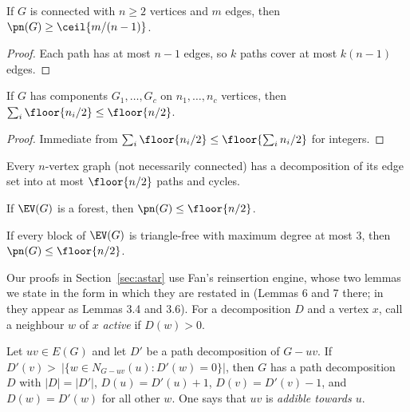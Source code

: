 \begin{lemma}\label{lem:LB2}
If $G$ is connected with $n\ge 2$ vertices and $m$ edges, then
$\pn(G)\ge \ceil{m/(n-1)}$.
\end{lemma}

\begin{proof}
Each path has at most $n-1$ edges, so $k$ paths cover at most $k(n-1)$ edges.
\end{proof}

\begin{lemma}\label{lem:sum}
If $G$ has components $G_1,\dots,G_c$ on $n_1,\dots,n_c$ vertices, then
$\sum_i \floor{n_i/2}\le \floor{n/2}$.
\end{lemma}

\begin{proof}
Immediate from $\sum_i \floor{n_i/2}\le \floor{\sum_i n_i /2}$ for integers.
\end{proof}

\begin{theorem}\label{thm:lovasz}
Every $n$-vertex graph (not necessarily connected) has a decomposition of its edge set into at
most $\floor{n/2}$ paths and cycles.
\end{theorem}

\begin{theorem}\label{thm:pyber}
If $\EV(G)$ is a forest, then $\pn(G)\le \floor{n/2}$.
\end{theorem}

\begin{theorem}\label{thm:fan}
If every block of $\EV(G)$ is triangle-free with maximum degree at most $3$, then
$\pn(G)\le \floor{n/2}$.
\end{theorem}

Our proofs in Section~\ref{sec:astar} use Fan's reinsertion engine, whose two lemmas we state
in the form in which they are restated in \cite{BS21} (Lemmas 6 and 7 there; in \cite{Fan05}
they appear as Lemmas 3.4 and 3.6). For a decomposition $D$ and a vertex $x$, call a neighbour
$w$ of $x$ \emph{active} if $D(w)>0$.

\begin{lemma}\label{lem:fan6}
Let $uv\in E(G)$ and let $D'$ be a path decomposition of $G-uv$. If
$D'(v)>\ |\{w\in N_{G-uv}(u) : D'(w)=0\}|$, then $G$ has a path decomposition $D$ with
$|D|=|D'|$, $D(u)=D'(u)+1$, $D(v)=D'(v)-1$, and $D(w)=D'(w)$ for all other $w$. One says that
$uv$ is \emph{addible towards $u$}.
\end{lemma}

